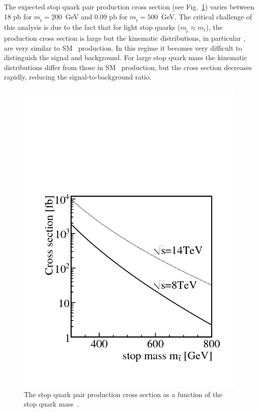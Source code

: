 The expected stop quark pair production cross section (see Fig.~\ref{fig:stopxsec}) varies between 18 pb
for $m_{\tilde{t}}=200$~GeV and 0.09 pb for $m_{\tilde{t}}=500$~GeV\cite{xsec0}.
The critical challenge of this analysis
is due to the fact that for light stop quarks ($m_{\tilde{t}} \approx m_t$), the production cross section is
large but the kinematic distributions, in particular \mt, are very similar to SM \ttbar\ production. In this regime 
it becomes very
difficult to distinguish the signal and background. For large stop quark mass the kinematic distributions differ
from those in SM \ttbar\ production, but the cross section decreases rapidly, reducing the signal-to-background
ratio.

\begin{figure}[hbt]
  \begin{center}
	\includegraphics[width=0.5\linewidth]{plots/stop_cs.png}
	\caption{
	  \label{fig:stopxsec}\protect 
          The stop quark pair production cross section as a
          function of the stop quark mass~\cite{xsec}.}
  \end{center}
\end{figure}

